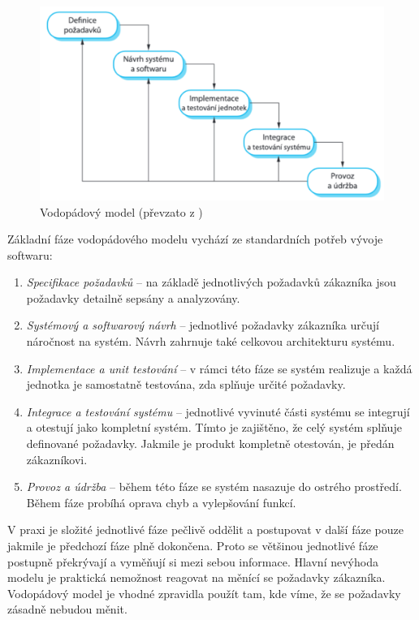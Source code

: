 \documentclass[czech,master,public,dept460,male,cpdeclaration,oneside]{diploma}
\begin{document}
\begin{figure}[!ht]
    \centering
    \includegraphics[width=1\textwidth]{Diplomka/Figures/waterfall.png}
    \caption{Vodopádový model (převzato z \cite{ref:sommerrville_waterfall})}
    \label{fig:waterfall}
\end{figure}

Základní fáze vodopádového modelu vychází ze standardních potřeb vývoje softwaru:

\begin{enumerate}
\item \textit{Specifikace požadavků} -- na základě jednotlivých požadavků zákazníka jsou požadavky detailně sepsány a analyzovány.

\item \textit{Systémový a softwarový návrh} -- jednotlivé požadavky zákazníka určují náročnost na systém. Návrh zahrnuje také celkovou architekturu systému. 

\item \textit{Implementace a unit testování} -- v rámci této fáze se systém realizuje a každá jednotka je samostatně testována, zda splňuje určité požadavky.

\item \textit{Integrace a testování systému} -- jednotlivé vyvinuté části systému se integrují a otestují jako kompletní systém. Tímto je zajištěno, že celý systém splňuje definované požadavky. Jakmile je produkt kompletně otestován, je předán zákazníkovi.

\item \textit{Provoz a údržba} -- během této fáze se systém nasazuje do ostrého prostředí. Během fáze probíhá oprava chyb a vylepšování funkcí.

\end{enumerate}

V praxi je složité jednotlivé fáze pečlivě oddělit a postupovat v další fáze pouze jakmile je předchozí fáze plně dokončena. Proto se většinou jednotlivé fáze postupně překrývají a vyměňují si mezi sebou informace. Hlavní nevýhoda modelu je praktická nemožnost reagovat na měnící se požadavky zákazníka. Vodopádový model je vhodné zpravidla použít tam, kde víme, že se požadavky zásadně nebudou měnit.
\end{document}
